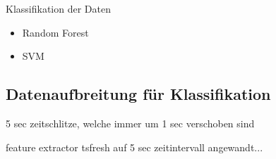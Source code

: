 Klassifikation der Daten
\begin{itemize}
    \item Random Forest
    \item SVM
\end{itemize}

\subsection{Datenaufbreitung für Klassifikation}

5 sec zeitschlitze, welche immer um 1 sec verschoben sind

feature extractor tsfresh auf 5 sec zeitintervall angewandt...
